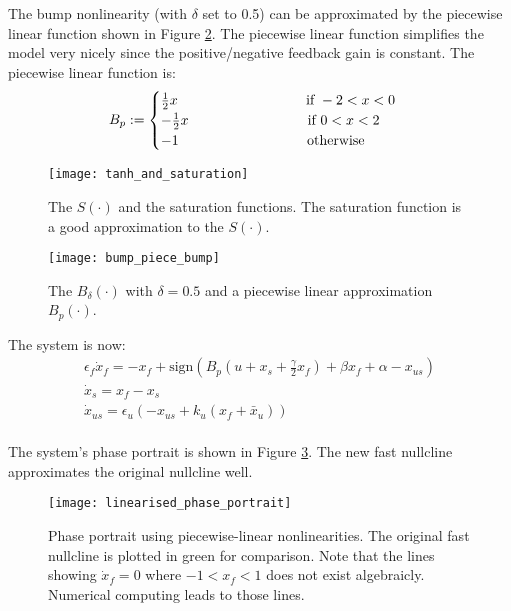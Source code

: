 \documentclass[a4paper, 12pt]{article}
\begin{document}
The bump nonlinearity (with $\delta$ set to 0.5) can be approximated by the piecewise linear function shown in Figure \ref{fig:bump_linear}. The piecewise linear function simplifies the model very nicely since the positive/negative feedback gain is constant. The piecewise linear function is:
\begin{equation}
B_p:= \begin{cases}
\frac{1}{2}x \text{ \hspace{3cm}  if } -2<x<0 \\
-\frac{1}{2}x \text{\hspace{3cm}if } 0<x<2 \\
-1 \text{ \hspace{3cm}  otherwise}
\end{cases}
\end{equation}

\begin{figure}[p]
\texttt{[image: tanh\_and\_saturation]}
\caption{The $S(\cdot)$ and the saturation functions. The saturation function is a good approximation to the $S(\cdot)$. }
\label{fig:sigmoid_linear}
\end{figure}

\begin{figure}[p]
\texttt{[image: bump\_piece\_bump]}
\caption{The $B_\delta(\cdot)$ with $\delta = 0.5$ and a piecewise linear approximation $B_p(\cdot)$.}
\label{fig:bump_linear}
\end{figure}
The system is now: 
\begin{equation}
\begin{array}{l}
\displaystyle \epsilon_f\dot{x}_{f} = -x_f + \text{sign}\left(B_p\left(u + x_s + \tfrac{\gamma}{2}x_f\right) + \beta x_f + \alpha  - x_{us}  \right)\\
\displaystyle \dot{x}_{s} = x_f - x_s \\
\displaystyle \dot{x}_{us} = \epsilon_u\left(-x_{us} + k_u(x_f+\bar{x}_u) \right)\\
\end{array}
\label{eq:restSpikeBistability}
\end{equation}

The system's phase portrait is shown in Figure \ref{fig:linearised_phase_portrait}. The new fast nullcline approximates the original nullcline well. 

\begin{figure}[p]
\texttt{[image: linearised\_phase\_portrait]}
\caption{Phase portrait using piecewise-linear nonlinearities. The original fast nullcline is plotted in green for comparison. Note that the lines showing $\dot{x}_f=0$ where $-1<x_f<1$ does not exist algebraicly. Numerical computing leads to those lines.}
\label{fig:linearised_phase_portrait}
\end{figure}
\end{document}
